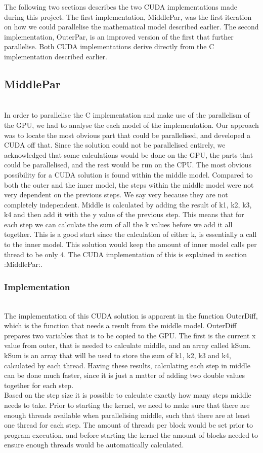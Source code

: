 The following two sections describes the two CUDA implementations made during this project. The first implementation, MiddlePar, was the first iteration on how we could parallelise the mathematical model described earlier. The second implementation, OuterPar, is an improved version of the first that further parallelise. Both CUDA implementations derive directly from the C implementation described earlier.

\subsection{MiddlePar} \hfill \\
In order to parallelise the C implementation and make use of the parallelism of the GPU, we had to analyse the each model of the implementation. Our approach was to locate the most obvious part that could be parallelised, and developed a CUDA off that. Since the solution could not be parallelised entirely, we acknowledged that some calculations would be done on the GPU, the parts that could be parallelised, and the rest would be run on the CPU. The most obvious possibility for a CUDA solution is found within the middle model. Compared to both the outer and the inner model, the steps within the middle model were not very dependent on the previous steps. We say very because they are not completely independent. Middle is calculated by adding the result of k1, k2, k3, k4 and then add it with the y value of the previous step. This means that for each step we can calculate the sum of all the k values before we add it all together. This is a good start since the calculation of either k, is essentially a call to the inner model. This solution would keep the amount of inner model calls per thread to be only 4. The CUDA implementation of this is explained in section :MiddlePar:.

\subsubsection{Implementation} \hfill \\
The implementation of this CUDA solution is apparent in the function OuterDiff, which is the function that needs a result from the middle model. OuterDiff prepares two variables that is to be copied to the GPU. The first is the current x value from outer, that is needed to calculate middle, and an array called kSum. kSum is an array that will be used to store the sum of k1, k2, k3 and k4, calculated by each thread. Having these results, calculating each step in middle can be done much faster, since it is just a matter of adding two double values together for each step. \\
Based on the step size it is possible to calculate exactly how many steps middle needs to take. Prior to starting the kernel, we need to make sure that there are enough threads available when parallelising middle, such that there are at least one thread for each step. The amount of threads per block would be set prior to program execution, and before starting the kernel the amount of blocks needed to ensure enough threads would be automatically calculated.\\

